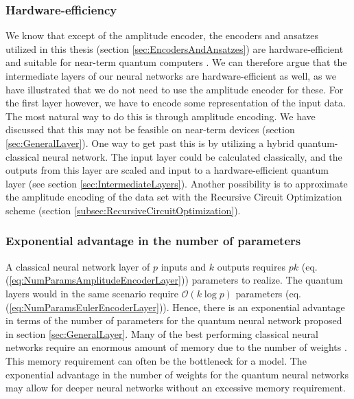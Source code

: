 \subsubsection{Hardware-efficiency}
We know that except of the amplitude encoder, the encoders and ansatzes utilized in this thesis (section \ref{sec:EncodersAndAnsatzes}) are hardware-efficient and suitable for near-term quantum computers \cite{MaxCutAndEulerRotationHardwareEfficient}. We can therefore argue that the intermediate layers of our neural networks are hardware-efficient as well, as we have illustrated that we do not need to use the amplitude encoder for these. For the first layer however, we have to encode some representation of the input data. The most natural way to do this is through amplitude encoding. We have discussed that this may not be feasible on near-term devices (section \ref{sec:GeneralLayer}). One way to get past this is by utilizing a hybrid quantum-classical neural network. The input layer could be calculated classically, and the outputs from this layer are scaled and input to a hardware-efficient quantum layer (see section \ref{sec:IntermediateLayers}). Another possibility is to approximate the amplitude encoding of the data set with the Recursive Circuit Optimization scheme (section \ref{subsec:RecursiveCircuitOptimization}).

\subsubsection{Exponential advantage in the number of parameters}
A classical neural network layer of $p$ inputs and $k$ outputs requires $pk$ (eq. (\ref{eq:NumParamsAmplitudeEncoderLayer})) parameters to realize. The quantum layers would in the same scenario require $\mathcal{O}(k\log{p})$ parameters (eq. (\ref{eq:NumParamsEulerEncoderLayer})). Hence, there is an exponential advantage in terms of the number of parameters for the quantum neural network proposed in section \ref{sec:GeneralLayer}.\newline
Many of the best performing classical neural networks require an enormous amount of memory due to the number of weights \cite{WeightPruning}. This memory requirement can often be the bottleneck for a model. The exponential advantage in the number of weights for the quantum neural networks may allow for deeper neural networks without an excessive memory requirement.

